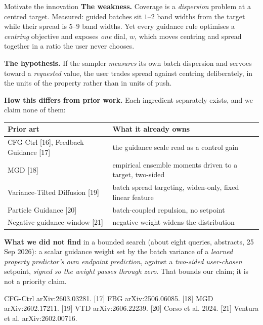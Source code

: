 \documentclass[aspectratio=169,10pt]{beamer}
\newcommand{\theslidelabel}{}
\newcommand{\lbl}[1]{\renewcommand{\theslidelabel}{#1}}
\newcommand{\srcs}[1]{\vfill{\raggedleft\color{grayt}\fontsize{4.9}{5.6}\selectfont #1\par}}
\begin{document}
\lbl{2c}
\begin{frame}[shrink=15]{Motivate the innovation}
  \textbf{The weakness.} Coverage is a \emph{dispersion} problem at a centred
  target. Measured: guided batches sit $1$--$2$ band widths from the target while
  their spread is $5$--$9$ band widths. Yet every guidance rule optimises a
  \emph{centring} objective and exposes \emph{one} dial, $w$, which moves centring
  and spread together in a ratio the user never chooses.

  \medskip
  \textbf{The hypothesis.} If the sampler \emph{measures} its own batch dispersion
  and servoes toward a \emph{requested} value, the user trades spread against
  centring deliberately, in the units of the property rather than in units of push.

  \medskip
  \textbf{How this differs from prior work.} Each ingredient separately exists, and
  we claim none of them:
  {\small
  \begin{tabular}{ll}
    \toprule
    Prior art & What it already owns \\
    \midrule
    CFG-Ctrl [16], Feedback Guidance [17] & the guidance scale read as a control gain \\
    MGD [18] & empirical ensemble moments driven to a target, two-sided \\
    Variance-Tilted Diffusion [19] & batch spread targeting, widen-only, fixed linear feature \\
    Particle Guidance [20] & batch-coupled repulsion, no setpoint \\
    Negative-guidance window [21] & negative weight widens the distribution \\
    \bottomrule
  \end{tabular}}

  \medskip
  \textbf{What we did not find} in a bounded search (about eight queries, abstracts,
  25 Sep 2026): a scalar guidance weight set by the batch variance of a
  \emph{learned property predictor's own endpoint prediction}, against a
  \emph{two-sided user-chosen} setpoint, \emph{signed so the weight passes through
  zero}. That bounds our claim; it is not a priority claim.

  \srcs{[16] CFG-Ctrl arXiv:2603.03281. [17] FBG arXiv:2506.06085.
        [18] MGD arXiv:2602.17211. [19] VTD arXiv:2606.22239.
        [20] Corso et al. 2024. [21] Ventura et al. arXiv:2602.00716.}
\end{frame}
\end{document}

